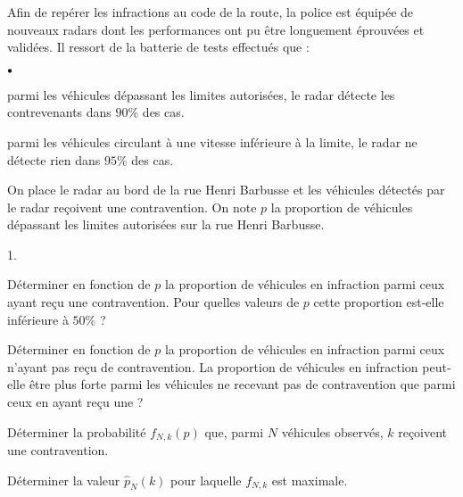 \documentclass[11pt]{article}%
\begin{document}
\noindent
Afin de repérer les infractions au code de la route, la police est équipée de nouveaux radars dont les performances ont pu être longuement éprouvées et validées. Il ressort de la batterie de tests effectués que :
\begin{noliste}{$\scriptstyle \bullet$}
 \item parmi les véhicules dépassant les limites autorisées, le radar détecte les contrevenants dans $90\%$ des cas.
 
 \item parmi les véhicules circulant à une vitesse inférieure à la limite, le radar ne détecte rien dans $95\%$ des cas.
\end{noliste}
On place le radar au bord de la rue Henri Barbusse et les véhicules détectés par le radar reçoivent une contravention. On note $p$ la proportion de véhicules dépassant les limites autorisées sur la rue Henri Barbusse.
\begin{noliste}{1.}
 \item Déterminer en fonction de $p$ la proportion de véhicules en infraction parmi ceux ayant reçu une contravention. Pour quelles valeurs de $p$ cette proportion est-elle inférieure à $50\%$ ?
 
 \item Déterminer en fonction de $p$ la proportion de véhicules en infraction parmi ceux n'ayant pas reçu de contravention. La proportion de véhicules en infraction peut-elle être plus forte parmi les véhicules ne recevant pas de contravention que parmi ceux en ayant reçu une ?
 
 \item Déterminer la probabilité $f_{N,k}(p)$ que, parmi $N$ véhicules observés, $k$ reçoivent une contravention.
 
 \item Déterminer la valeur $\hat{p}_N(k)$ pour laquelle $f_{N,k}$ est maximale.
\end{noliste}
\end{document}

